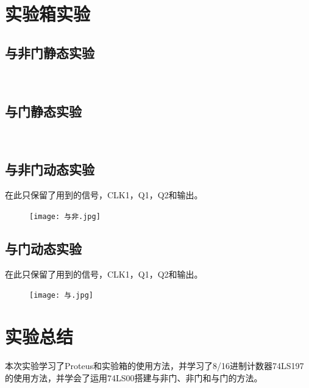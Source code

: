 \documentclass[UTF8, a4paper, 11pt]{article}
\begin{document}
\section{实验箱实验}
\subsection{与非门静态实验}
\begin{figure}[H] %
	\centering  %
	\vspace{-0.35cm} %
	\subfigtopskip=2pt %
	\subfigbottomskip=2pt %
	\subfigcapskip=2pt %
	\quad %
	\\%
	\quad
\end{figure}
\subsection{与门静态实验}
\begin{figure}[H] %
	\centering  %
	\vspace{-0.35cm} %
	\subfigtopskip=2pt %
	\subfigbottomskip=2pt %
	\subfigcapskip=2pt %
	\quad %
	\\%
	\quad
\end{figure}
\subsection{与非门动态实验}
在此只保留了用到的信号，CLK1，Q1，Q2和输出。
\begin{figure}[H]
    \centering
    \texttt{[image: 与非.jpg]}
\end{figure}
\subsection{与门动态实验}
在此只保留了用到的信号，CLK1，Q1，Q2和输出。
\begin{figure}[H]
    \centering
    \texttt{[image: 与.jpg]}
\end{figure}
\section{实验总结}
本次实验学习了Proteus和实验箱的使用方法，并学习了8/16进制计数器74LS197的使用方法，并学会了运用74LS00搭建与非门、非门和与门的方法。
%
%
\end{document}
